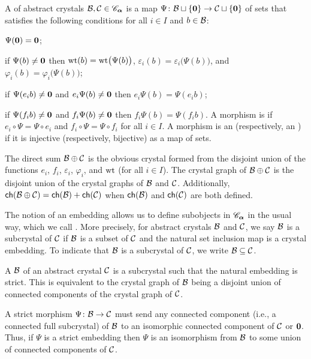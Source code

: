 \documentclass[11pt]{article}
\begin{document}
\begin{definition}
\label{morphism-def}
A  of abstract 
crystals $\mathcal{B}, \mathcal{C} \in \mathscr{C}_{\boldsymbol{\alpha}}$ is a map $\Psi \colon \mathcal{B} \sqcup\{\boldsymbol{0}\}\to \mathcal{C}\sqcup\{\boldsymbol{0}\}$ of sets that satisfies the following conditions for all $i \in I$ and $b \in \mathcal{B}$:
\ben
\item[(M0)] $\Psi(\boldsymbol{0}) = \boldsymbol{0}$;
\item[(M1)] if $\Psi(b) \neq \boldsymbol{0}$ then $\operatorname{wt}(b) = \operatorname{wt}\bigl(\Psi(b)\bigr)$, $ \varepsilon_i(b) = \varepsilon_i\bigl(\Psi(b)\bigr)$, and $\varphi_i(b) = \varphi_i\bigl(\Psi(b)\bigr)$;
\item[(M2)] if $\Psi(e_ib)\neq \boldsymbol{0}$ and $e_i \Psi(b)\neq \boldsymbol{0}$ then $e_i \Psi(b)  =\Psi(e_i b)$;
\item[(M3)] if $\Psi(f_ib)\neq \boldsymbol{0}$ and $f_i \Psi(b)\neq \boldsymbol{0}$ then $f_i \Psi(b) =\Psi(f_i b)$.
\een
A morphism is  if $e_i \circ \Psi = \Psi \circ e_i$ and $f_i\circ \Psi = \Psi \circ f_i$ for all $i \in I$.
A morphism is an  (respectively, an ) if it is injective (respectively, bijective) as a map of sets.
\end{definition}


The direct sum $\mathcal{B} \oplus \mathcal{C}$ is the obvious crystal formed from the disjoint union of the functions $e_i$, $f_i$, $\varepsilon_i$, $\varphi_i$, and $\operatorname{wt}$ (for all $i \in I$).
The crystal graph of $\mathcal{B} \oplus \mathcal{C}$ is the disjoint union of the crystal graphs of $\mathcal{B}$ and $\mathcal{C}$.
Additionally, $\mathsf{ch}(\mathcal{B} \oplus \mathcal{C}) = \mathsf{ch}(\mathcal{B}) + \mathsf{ch}(\mathcal{C})$ when $\mathsf{ch}(\mathcal{B})$ and $ \mathsf{ch}(\mathcal{C})$ are both defined.

The notion of an embedding allows us to define subobjects in $\mathscr{C}_{\boldsymbol{\alpha}}$ in the usual way, which we call . More precisely, for abstract crystals $\mathcal{B}$ and $\mathcal{C}$, we say $\mathcal{B}$ is a subcrystal of $\mathcal{C}$ if $\mathcal{B}$ is a subset of $\mathcal{C}$ and the natural set inclusion map is a crystal embedding.
To indicate that $\mathcal{B}$ is a subcrystal of $\mathcal{C}$, we write $\mathcal{B} \subseteq \mathcal{C}$.

A  $\mathcal{B}$ of an abstract crystal $\mathcal{C}$ is a subcrystal such that the natural embedding is strict.
This is equivalent to the crystal graph of $\mathcal{B}$ being a disjoint union of connected components of the crystal graph of $\mathcal{C}$.

A strict morphism $\Psi \colon \mathcal{B} \to \mathcal{C}$ must send any connected component (i.e., a connected full subcrystal) of $\mathcal{B}$ to an isomorphic connected component of $\mathcal{C}$ or $\boldsymbol{0}$.
Thus, if $\Psi$ is a strict embedding then $\Psi$ is an isomorphism from $\mathcal{B}$ to some union of connected components of $\mathcal{C}$.
\end{document}
